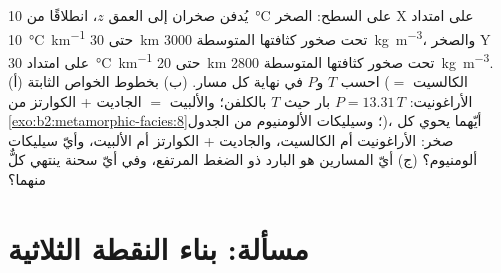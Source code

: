 \begin{exercise}[$\star\star\star$]\label{exo:b2:metamorphic-facies:12}
يُدفن صخران إلى العمق $z$، انطلاقًا من \qty{10}{\celsius} على السطح: الصخر X على امتداد
\qty{10}{\celsius.km^{-1}} حتى \qty{30}{km} تحت صخور كثافتها المتوسطة
\qty{3000}{kg.m^{-3}}، والصخر Y على امتداد \qty{30}{\celsius.km^{-1}} حتى \qty{20}{km} تحت صخور
كثافتها المتوسطة \qty{2800}{kg.m^{-3}}. (أ) احسب $T$ و$P$ في نهاية كل مسار.
(ب) بخطوط الخواص الثابتة (الكالسيت $=$ الأراغونيت: $P = 13.31\,T$ بار حيث $T$
بالكلفن؛ والألبيت $=$ الجاديت + الكوارتز من \cref{exo:b2:metamorphic-facies:8}؛ وسيليكات الألومنيوم من
الجدول)، أيّهما يحوي كل صخر: الأراغونيت أم الكالسيت، والجاديت + الكوارتز أم الألبيت، وأيّ
سيليكات ألومنيوم؟ (ج) أيّ المسارين هو البارد ذو الضغط المرتفع، وفي أيّ سحنة ينتهي كلٌّ منهما؟
\end{exercise}

\section{مسألة: بناء النقطة الثلاثية}

